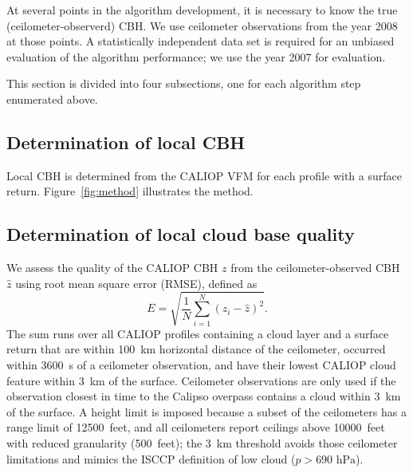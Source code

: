 \documentclass[essd,manuscript]{copernicus}\usepackage[]{graphicx}\usepackage[]{color}
\begin{document}
At several points in the algorithm development, it is necessary to know the true
(ceilometer-observerd) CBH.  We use ceilometer observations from
the year 2008 at those points.  A statistically independent data set is required
for an unbiased evaluation of the algorithm performance; we use the year
2007 for evaluation.

This section is divided into four subsections, one for each algorithm step
enumerated above.

\subsection{Determination of local CBH}
\label{sec:algorithm:local}
Local CBH is determined from the CALIOP VFM for each profile with a surface
return.  Figure~\ref{fig:method} illustrates the method.

\subsection{Determination of local cloud base quality}
\label{sec:algorithm:qual}
We assess the quality of the CALIOP CBH $z$ from the
ceilometer-observed CBH $\hat{z}$ using root mean square error
(RMSE), defined as
\begin{equation}
  \label{eq:rmse}
  E = \sqrt{\frac{1}{N}\sum\limits_{i = 1}^{N}\left(z_i - \hat{z}\right)^2}.
\end{equation}
The sum runs over all CALIOP profiles containing a cloud layer and a surface
return that are within 100~km horizontal distance of the ceilometer, occurred
within 3600~s of a ceilometer observation, and have their lowest CALIOP cloud
feature within 3~km of the surface.  Ceilometer observations are only used if
the observation closest in time to the Calipso overpass contains a cloud within
3~km of the surface.  A height limit is imposed because a subset of the
ceilometers has a range limit of 12500~feet, and all ceilometers report ceilings
above 10000~feet with reduced granularity (500~feet); the 3~km threshold avoids
those ceilometer limitations and mimics the ISCCP definition of low cloud
($p > 690\text{ hPa}$).
\end{document}
